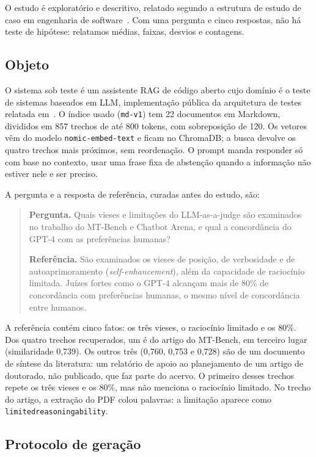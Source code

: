 \documentclass[12pt]{article}
\newcommand{\code}[1]{\texttt{\small #1}}
\begin{document}
O estudo é exploratório e descritivo, relatado segundo a estrutura de estudo de
caso em engenharia de software~\cite{runeson2009guidelines}. Com uma pergunta e
cinco respostas, não há teste de hipótese: relatamos médias, faixas, desvios e
contagens.

\subsection{Objeto}

O sistema sob teste é um assistente RAG de código aberto cujo domínio é o teste de
sistemas baseados em LLM, implementação pública da arquitetura de testes relatada
em~\cite{oliveira2026sast}. O índice usado (\code{md-v1}) tem 22 documentos em
Markdown, divididos em 857 trechos de até 800 tokens, com sobreposição de 120. Os
vetores vêm do modelo \code{nomic-embed-text} e ficam no ChromaDB; a busca devolve
os quatro trechos mais próximos, sem reordenação. O prompt manda responder só com
base no contexto, usar uma frase fixa de abstenção quando a informação não estiver
nele e ser preciso.

A pergunta e a resposta de referência, curadas antes do estudo, são:

\begin{quote}
\small
\textbf{Pergunta.} Quais vieses e limitações do LLM-as-a-judge são examinados no
trabalho do MT-Bench e Chatbot Arena, e qual a concordância do GPT-4 com as
preferências humanas?

\textbf{Referência.} São examinados os vieses de posição, de verbosidade e de
autoaprimoramento (\emph{self-enhancement}), além da capacidade de raciocínio
limitada. Juízes fortes como o GPT-4 alcançam mais de 80\% de concordância com
preferências humanas, o mesmo nível de concordância entre humanos.
\end{quote}

A referência contém cinco fatos: os três vieses, o raciocínio limitado e os 80\%.
Dos quatro trechos recuperados, um é do artigo do MT-Bench, em terceiro lugar
(similaridade 0,739). Os outros três (0,760, 0,753 e 0,728) são de um documento de
síntese da literatura: um relatório de apoio ao planejamento de um artigo de
doutorado, não publicado, que faz parte do acervo. O primeiro desses trechos repete
os três vieses e os 80\%, mas não menciona o raciocínio limitado. No trecho do artigo,
a extração do PDF colou palavras: a limitação aparece como
\code{limitedreasoningability}.

\subsection{Protocolo de geração}
\label{sec:protocolo}
\end{document}

